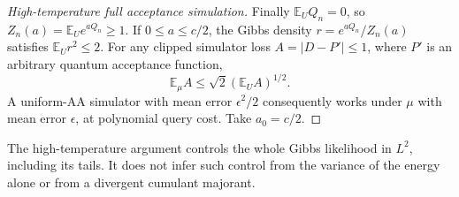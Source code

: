 \begin{proof}[High-temperature full acceptance simulation]
Finally $\mathbb E_UQ_n=0$, so $Z_n(a)=\mathbb E_Ue^{aQ_n}\ge1$.
If $0\le a\le c/2$, the Gibbs density $r=e^{aQ_n}/Z_n(a)$ satisfies
$\mathbb E_Ur^2\le2$.  For any clipped simulator loss
$A=|D-P'|\le1$, where $P'$ is an arbitrary quantum acceptance
function,
\[
 \mathbb E_\mu A\le\sqrt2(\mathbb E_UA)^{1/2}.
\]
A uniform-AA simulator with mean error $\epsilon^2/2$ consequently
works under $\mu$ with mean error $\epsilon$, at polynomial query
cost.  Take $a_0=c/2$.
\end{proof}

The high-temperature argument controls the whole Gibbs likelihood in
$L^2$, including its tails.  It does not infer such control from the
variance of the energy alone or from a divergent cumulant majorant.
